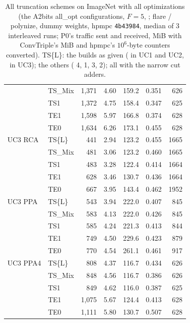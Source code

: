 \begin{table}[t]
\begin{tabular}{@{}llrrrrr@{}}
 & TS\_Mix & 1{,}371 & 4.60 & 159.2 & 0.351 & 626\\
 & TS1 & 1{,}372 & 4.75 & 158.4 & 0.347 & 625\\
 & TE1 & 1{,}598 & 5.97 & 166.8 & 0.374 & 628\\
 & TE0 & 1{,}634 & 6.26 & 173.1 & 0.455 & 628\\
\addlinespace
UC3 RCA & TS\{L\} & 441 & 2.94 & 123.2 & 0.455 & 1665\\
 & TS\_Mix & 481 & 3.06 & 123.2 & 0.460 & 1665\\
 & TS1 & 483 & 3.28 & 122.4 & 0.414 & 1664\\
 & TE1 & 628 & 3.46 & 130.7 & 0.436 & 1664\\
 & TE0 & 667 & 3.95 & 143.4 & 0.462 & 1952\\
UC3 PPA & TS\{L\} & 543 & 3.94 & 222.0 & 0.407 & 845\\
 & TS\_Mix & 583 & 4.13 & 222.0 & 0.426 & 845\\
 & TS1 & 585 & 4.24 & 221.3 & 0.413 & 844\\
 & TE1 & 749 & 4.50 & 229.6 & 0.423 & 879\\
 & TE0 & 770 & 4.54 & 261.1 & 0.461 & 917\\
UC3 PPA4 & TS\{L\} & 808 & 4.37 & 116.7 & 0.434 & 626\\
 & TS\_Mix & 848 & 4.56 & 116.7 & 0.386 & 626\\
 & TS1 & 849 & 4.62 & 116.0 & 0.387 & 625\\
 & TE1 & 1{,}075 & 5.67 & 124.4 & 0.413 & 628\\
 & TE0 & 1{,}111 & 5.80 & 130.7 & 0.507 & 628\\
\bottomrule
\end{tabular}
\caption{All truncation schemes on ImageNet with all optimizations (the A2bits all\_opt configurations, $F = 5$,
; flare / polynize, dummy weights, hpmpc \texttt{4b43984}, median of 3 interleaved runs; P0's traffic
sent and received, MiB with ConvTriple's MiB and hpmpc's $10^6$-byte counters converted). TS\{L\}: the builds as given
( in UC1 and UC2,  in UC3); the others 
( 4, 1, 3, 2); all with the narrow cut adders.}
\label{tab:trunc}
\end{table}



